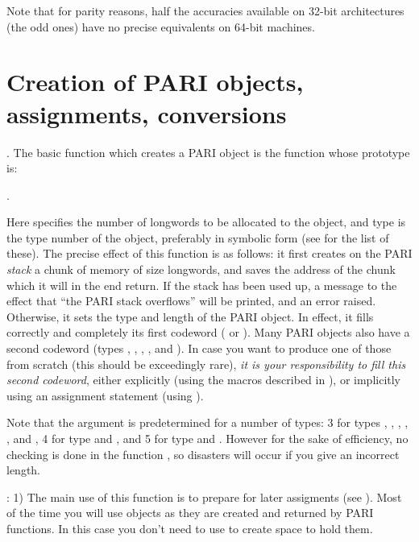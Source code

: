 Note that for parity reasons, half the accuracies available on 32-bit
architectures (the odd ones) have no precise equivalents on 64-bit machines.

\section{Creation of PARI objects, assignments, conversions}

.
The basic function which creates a PARI object is the function
 whose prototype is:

.

\noindent
Here  specifies the number of longwords to be allocated to the
object, and type is the type number of the object, preferably in symbolic
form (see  for the list of these). The precise effect of
this function is as follows: it first creates on the PARI {\it stack\/} a
chunk of memory of size  longwords, and saves the address of the
chunk which it will in the end return.  If the stack has been used up, a
message to the effect that ``the PARI stack overflows'' will be printed,
and an error raised. Otherwise, it sets the type and length of the PARI object.
In effect, it fills correctly and completely its first codeword ( or
).  Many PARI objects also have a second codeword (types ,
,  , , and ). In case you want to
produce one of those from scratch (this should be exceedingly rare), {\it it
is your responsibility to fill this second codeword}, either explicitly (using
the macros described in ), or implicitly using an assignment
statement (using ).

Note that the argument  is predetermined for a number of types:
3 for types , , , ,
,  and , 4 for type 
and , and 5 for type  and . However for the sake
of efficiency, no checking is done in the function , so
disasters will occur if you give an incorrect length.

:
1)  The main use of this function is to prepare for later assigments
(see ). Most of the time you will use  objects
as they are created and returned by PARI functions. In this case you don't need
to use  to create space to hold them.

